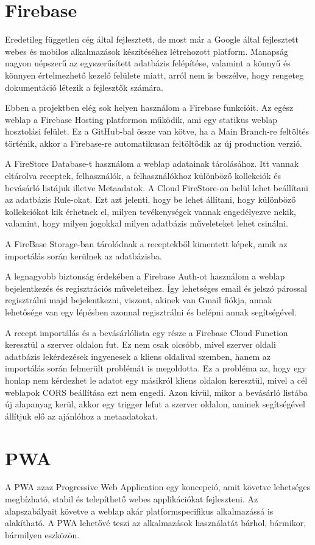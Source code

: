 \documentclass[12pt]{report}
\theoremstyle{definition}
\begin{document}
\section{Firebase}
Eredetileg független cég által fejlesztett, de most már a Google által fejlesztett webes és mobilos alkalmazások készítéséhez létrehozott platform. 
Manapság nagyon népszerű az egyszerűsített adatbázis felépítése, valamint a könnyű és könnyen értelmezhető kezelő felülete miatt, arról nem is beszélve, hogy rengeteg dokumentáció létezik a fejlesztők számára.

Ebben a projektben elég sok helyen használom a Firebase funkcióit. 
Az egész weblap a Firebase Hosting platformon működik, ami egy statikus weblap hosztolási felület. 
Ez a GitHub-bal össze van kötve, ha a Main Branch-re feltöltés történik, akkor a Firebase-re automatikusan feltöltődik az új production verzió.

A FireStore Database-t használom a weblap adatainak tárolásához. 
Itt vannak eltárolva  receptek, felhasználók, a felhasználókhoz különböző kollekciók és bevásárló listájuk illetve \gls{Metaadatok}. 
A Cloud FireStore-on belül lehet beállítani az adatbázis Rule-okat. 
Ezt azt jelenti, hogy be lehet állítani, hogy különböző kollekciókat kik érhetnek el, milyen tevékenységek vannak engedélyezve nekik, valamint, hogy milyen jogokkal milyen adatbázis műveleteket lehet csinálni. 

A FireBase Storage-ban tárolódnak a receptekből kimentett képek, amik az importálás során kerülnek az adatbázisba.

A legnagyobb biztonság érdekében a Firebase Auth-ot használom a weblap bejelentkezés és regisztrációs műveleteihez. 
Így lehetséges email és jelszó párossal regisztrálni majd bejelentkezni, viszont, akinek van Gmail fiókja, annak lehetősége van egy lépésben azonnal regisztrálni és belépni annak segítségével.

A recept importálás és a bevásárlólista egy része a Firebase Cloud Function keresztül a szerver oldalon fut. 
Ez nem csak olcsóbb, mivel szerver oldali adatbázis lekérdezések ingyenesek a kliens oldalival szemben, hanem az importálás során felmerült problémát is megoldotta. 
Ez a  probléma az, hogy egy honlap nem kérdezhet le adatot egy másikról kliens oldalon keresztül, mivel a cél weblapok CORS beállítása ezt nem engedi. 
Azon kívül, mikor a bevásárló listába új alapanyag kerül, akkor egy trigger lefut a szerver oldalon, aminek segítségével állítjuk elő az ajánlóhoz a metaadatokat.


\section{PWA}
A PWA azaz Progressive Web Application egy koncepció, amit követve lehetséges megbízható, stabil és telepíthető webes applikációkat fejleszteni. 
Az alapszabályait követve a weblap akár platformspecifikus alkalmazássá is alakítható. A PWA lehetővé teszi az alkalmazások használatát bárhol, bármikor, bármilyen eszközön. 
\end{document}
